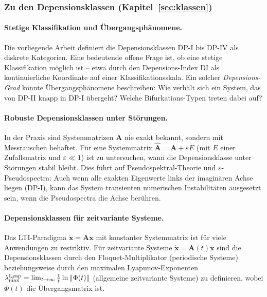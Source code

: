 ﻿\documentclass[12pt, a4paper]{article}
\theoremstyle{definition}
\theoremstyle{remark}
\newcommand{\vx}{\bm{x}}
\newcommand{\vA}{\bm{A}}
\begin{document}
\subsubsection{Zu den Depensionsklassen (Kapitel~\ref{sec:klassen})}

\paragraph{Stetige Klassifikation und Übergangsphänomene.}
Die vorliegende Arbeit definiert die Depensionsklassen DP-I bis DP-IV als diskrete
Kategorien. Eine bedeutende offene Frage ist, ob eine stetige Klassifikation möglich
ist -- etwa durch den Depensions-Index DI als kontinuierliche Koordinate auf einer
Klassifikationsskala. Ein solcher \emph{Depensions-Grad} könnte Übergangsphänomene
beschreiben: Wie verhält sich ein System, das von DP-II knapp in DP-I übergeht?
Welche Bifurkations-Typen treten dabei auf?

\paragraph{Robuste Depensionsklassen unter Störungen.}
In der Praxis sind Systemmatrizen $\vA$ nie exakt bekannt, sondern mit Messrauschen
behaftet. Für eine Systemmatrix $\hat{\vA} = \vA + \varepsilon E$ (mit $E$ einer
Zufallsmatrix und $\varepsilon \ll 1$) ist zu untersuchen, wann die Depensionsklasse
unter Störungen stabil bleibt. Dies führt auf Pseudospektral-Theorie und
$\varepsilon$-Pseudospectra: Auch wenn alle exakten Eigenwerte links der imaginären
Achse liegen (DP-I), kann das System transienten numerischen Instabilitäten ausgesetzt
sein, wenn die Pseudospectra die Achse berühren.

\paragraph{Depensionsklassen für zeitvariante Systeme.}
Das LTI-Paradigma $\dot{\vx} = \vA\vx$ mit konstanter Systemmatrix ist für viele
Anwendungen zu restriktiv. Für zeitvariante Systeme $\dot{\vx} = \vA(t)\vx$ sind
die Depensionsklassen durch den Floquet-Multiplikator (periodische Systeme) beziehungsweise
durch den maximalen Lyapunov-Exponenten $\lambda_{\max}^{\rm Lyap} = \lim_{t\to\infty}
\frac{1}{t}\ln\|\Phi(t)\|$ (allgemeine zeitvariante Systeme) zu definieren, wobei
$\Phi(t)$ die Übergangsmatrix ist.
\end{document}
